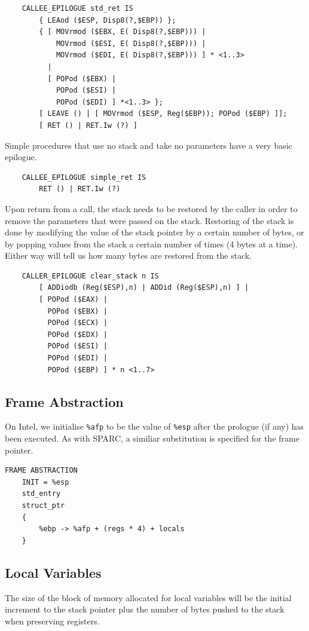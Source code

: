 \begin{verbatim}
    CALLEE_EPILOGUE std_ret IS
        { LEAod ($ESP, Disp8(?,$EBP)) };
        { [ MOVrmod ($EBX, E( Disp8(?,$EBP))) |
            MOVrmod ($ESI, E( Disp8(?,$EBP))) |
            MOVrmod ($EDI, E( Disp8(?,$EBP))) ] * <1..3>
          |
          [ POPod ($EBX) |
            POPod ($ESI) |
            POPod ($EDI) ] *<1..3> };
        [ LEAVE () | [ MOVrmod ($ESP, Reg($EBP)); POPod ($EBP) ]];
        [ RET () | RET.Iw (?) ]
\end{verbatim}

Simple procedures that use no stack and take no parameters have a
very basic epilogue.

\begin{verbatim}
    CALLEE_EPILOGUE simple_ret IS
        RET () | RET.Iw (?)
\end{verbatim}
 

Upon return from a call, the stack needs to be restored by the caller in 
order to remove the parameters that were passed on the stack.  
Restoring of the stack is done by modifying the value of the stack
pointer by a certain number of bytes, or by popping values from the
stack a certain number of times (4 bytes at a time).  Either way 
will tell us how many bytes are restored from the stack. 

\begin{verbatim}
    CALLER_EPILOGUE clear_stack n IS
        [ ADDiodb (Reg($ESP),n) | ADDid (Reg($ESP),n) ] |
        [ POPod ($EAX) |
          POPod ($EBX) |
          POPod ($ECX) |
          POPod ($EDX) |
          POPod ($ESI) |
          POPod ($EDI) |
          POPod ($EBP) ] * n <1..7>
\end{verbatim}

\subsection{Frame Abstraction}

On Intel, we initialise {\tt \%afp} to be the value of {\tt \%esp}
after the prologue (if any) has been executed. As with SPARC, a
similiar substitution is specified for the frame pointer.

\begin{verbatim}
FRAME ABSTRACTION
    INIT = %esp
    std_entry
    struct_ptr
    {
        %ebp -> %afp + (regs * 4) + locals
    }
\end{verbatim}


\subsection{Local Variables}
The size of the block of memory allocated for local variables will
be the initial increment to the stack pointer plus the number of
bytes pushed to the stack when preserving registers.

